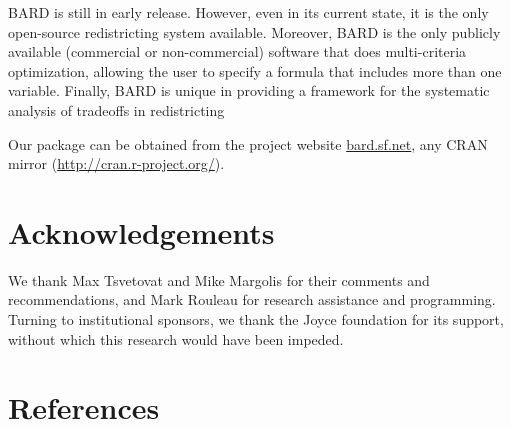 \documentclass[article]{JSSstyle/jss}
\begin{document}
BARD is still in early release. However, even in its current state, it is the only open-source redistricting system available.  Moreover, BARD is the only publicly available (commercial or non-commercial) software that does multi-criteria optimization, allowing the user to specify a formula that includes more than one variable.  Finally, BARD is  unique in providing  a framework for the systematic analysis of tradeoffs in redistricting 


Our package can be obtained from the project website \url{bard.sf.net}, any CRAN mirror (\url{http://cran.r-project.org/}).
 
\section{Acknowledgements}\vspace{-5pt}

We thank Max Tsvetovat and Mike Margolis for their comments and recommendations, and Mark Rouleau for research assistance and programming.  Turning to institutional sponsors, we thank the Joyce foundation for its support, without which this research would have been impeded. 

\section{References}\vspace{-5pt}

\end{document}
